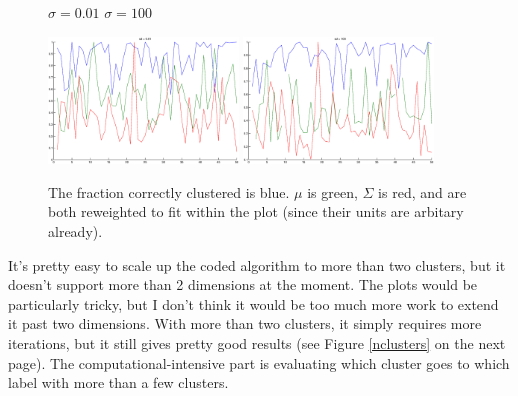 \documentclass[11pt]{report}
\begin{document}
\begin{figure}[h]
  \hfil$\sigma = 0.01$ \hfil $\sigma = 100$\hfil

  \includegraphics[width=0.45\textwidth]{results1hundredth.eps}
  \hfill
  \includegraphics[width=0.45\textwidth]{results100.eps}
  \caption{The fraction correctly clustered is blue. $\mu$ is green, $\Sigma$ is red, and are both reweighted to fit within the plot (since their units are arbitary already).}
  \label{results}
\end{figure}

It's pretty easy to scale up the coded algorithm to more than two clusters, but it doesn't support more than 2 dimensions at the moment. The plots would be particularly tricky, but I don't think it would be too much more work to extend it past two dimensions. With more than two clusters, it simply requires more iterations, but it still gives pretty good results (see Figure \ref{nclusters} on the next page). The computational-intensive part is evaluating which cluster goes to which label with more than a few clusters.
\end{document}
